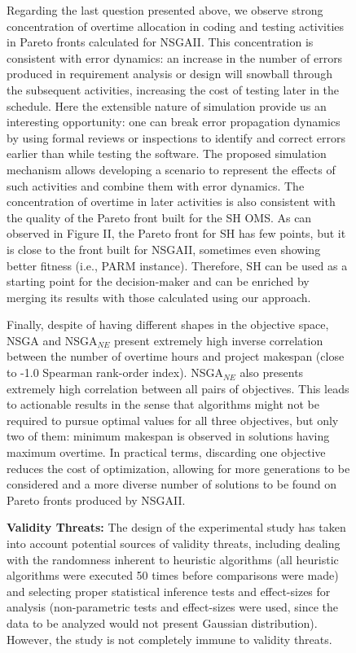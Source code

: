 \documentclass[conference]{IEEEtran}
\begin{document}
\begin{figure}
Regarding the last question presented above, we observe strong concentration of overtime allocation in coding and testing activities in Pareto fronts calculated for NSGAII. This concentration is consistent with error dynamics: an increase in the number of errors produced in requirement analysis or design will snowball through the subsequent activities, increasing the cost of testing later in the schedule. Here the extensible nature of simulation provide us an interesting opportunity: one can break error propagation dynamics by using formal reviews or inspections to identify and correct errors earlier than while testing the software. The proposed simulation mechanism allows developing a scenario to represent the effects of such activities \cite{Madachy:1996} and combine them with error dynamics. The concentration of overtime in later activities is also consistent with the quality of the Pareto front built for the SH OMS. As can observed in Figure II, the Pareto front for SH has few points, but it is close to the front built for NSGAII, sometimes even showing better fitness (i.e., PARM instance). Therefore, SH can be used as a starting point for the decision-maker and can be enriched by merging its results with those calculated using our approach.

Finally, despite of having different shapes in the objective space, NSGA and NSGA$_{NE}$ present extremely high inverse correlation between the number of overtime hours and project makespan (close to -1.0 Spearman rank-order index). NSGA$_{NE}$ also presents extremely high correlation between all pairs of objectives. This leads to actionable results in the sense that algorithms might not be required to pursue optimal values for all three objectives, but only two of them: minimum makespan is observed in solutions having maximum overtime. In practical terms, discarding one objective reduces the cost of optimization, allowing for more generations to be considered and a more diverse number of solutions to be found on Pareto fronts produced by NSGAII.

\noindent
\textbf{Validity Threats:} The design of the experimental study has taken into account potential sources of validity threats, including dealing with the randomness inherent to heuristic algorithms (all heuristic algorithms were executed 50 times before comparisons were made) and selecting proper statistical inference tests and effect-sizes for analysis (non-parametric tests and effect-sizes were used, since the data to be analyzed would not present Gaussian distribution). However, the study is not completely immune to validity threats.


\end{figure}
\end{document}
